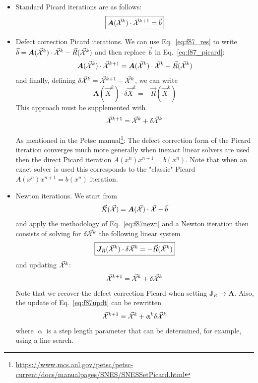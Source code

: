 \begin{itemize}
\item Standard Picard iterations are as follows:
\begin{equation}
\boxed{
{\bm A}(\vec{\cal X}^k) \cdot \vec{\cal X}^{k+1} = \vec{b} \label{eq:f87_picard}
}
\end{equation}


\item Defect correction Picard iterations. We can use Eq.~\eqref{eq:f87_res} to write 
$\vec{b} = {\bm A}(\vec{\cal X}^k)\cdot \vec{\cal X}^k  -\vec{R}(\vec{\cal X}^k)$
and then replace $\vec{b}$ in Eq.~\eqref{eq:f87_picard}:
\begin{equation}
{\bm A}(\vec{\cal X}^k) \cdot \vec{\cal X}^{k+1} 
= {\bm A}(\vec{\cal X}^k)\cdot \vec{\cal X}^k -\vec{R}(\vec{\cal X}^k)
\end{equation}
and finally, defining $\delta\vec{\cal X}^{k} = \vec{\cal X}^{k+1} -\vec{\cal X}^{k}$, 
we can write 
\[
\boxed{
{\bm A}(\vec{X}^k) \cdot \delta \vec{X}^{k} = -\vec{R}(\vec{X}^k)
}
\]
This approach must be supplemented with 
\[
\vec{\cal X}^{k+1} = \vec{\cal X}^k + \delta \vec{\cal X}^{k} 
\]

\begin{remark}
As mentioned in the Petsc manual\footnote{\url{https://www.mcs.anl.gov/petsc/petsc-current/docs/manualpages/SNES/SNESSetPicard.html}}:
The defect correction form of the Picard iteration converges much more generally when inexact linear solvers are used 
then the direct Picard iteration $A(x^n) x^{n+1} = b(x^n)$.  Note that when an exact solver is used this corresponds to the "classic" 
Picard $A(x^{n}) x^{n+1} = b(x^{n})$ iteration. 
\end{remark}


\item Newton iterations. We start from 
\[
\vec{\cal R}(\vec{\cal X}) = {\bm A}(\vec{\cal X})\cdot \vec{\cal X} - \vec{b} 
\]
and apply the methodology of Eq.~\eqref{eq:f87newt} 
and a Newton iteration then consists of solving 
for $\delta \vec{\cal X}^{k}$ the following linear system  
\[
\boxed{
{\bm J}_R(\vec{\cal X}^k) \cdot \delta \vec{\cal X}^{k} = -\vec{R}(\vec{\cal X}^k)
}
\]
and updating $\vec{\cal X}^k$:
\begin{equation}
\vec{\cal X}^{k+1} = \vec{\cal X}^k + \delta \vec{\cal X}^{k} 
\label{eq:f87updt}
\end{equation}
Note that we recover the defect correction Picard when setting ${\bm J}_R \rightarrow {\bm A}$.
Also, the update of Eq.~\eqref{eq:f87updt} can be rewritten
\[
\vec{\cal X}^{k+1} = \vec{\cal X}^k + \upalpha^k \delta \vec{\cal X}^{k} 
\]
where $\upalpha$ is a step length parameter that can be determined, for example, using
a line search.



\end{itemize}
